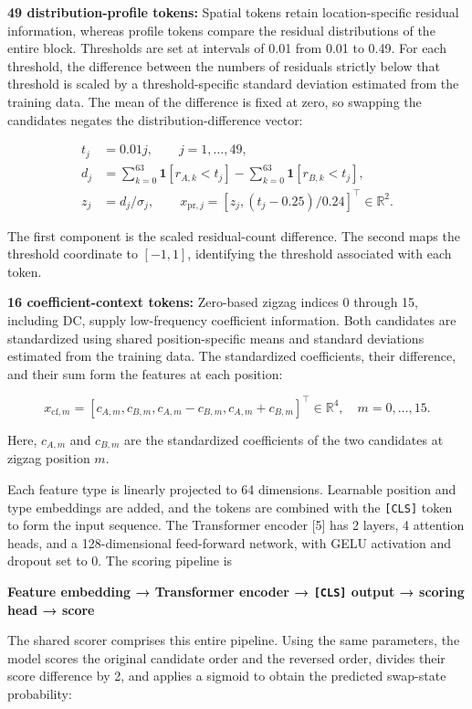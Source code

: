 \documentclass[
  11pt,
  a4paper,
]{article}
\begin{document}
\textbf{49 distribution-profile tokens:} Spatial tokens retain
location-specific residual information, whereas profile tokens compare
the residual distributions of the entire block. Thresholds are set at
intervals of 0.01 from 0.01 to 0.49. For each threshold, the difference
between the numbers of residuals strictly below that threshold is scaled
by a threshold-specific standard deviation estimated from the training
data. The mean of the difference is fixed at zero, so swapping the
candidates negates the distribution-difference vector:

\[
\begin{aligned}
t_j &= 0.01j,\qquad j=1,\dots,49,\\
d_j &= \sum_{k=0}^{63} \mathbf{1}[r_{A,k} < t_j] - \sum_{k=0}^{63} \mathbf{1}[r_{B,k} < t_j], \\
z_j &= d_j / \sigma_j, \qquad x_{\mathrm{pr},j} = [z_j, (t_j-0.25)/0.24]^\top \in \mathbb{R}^2.
\end{aligned} \tag{7}
\]

The first component is the scaled residual-count difference. The second
maps the threshold coordinate to \([-1,1]\), identifying the threshold
associated with each token.

\textbf{16 coefficient-context tokens:} Zero-based zigzag indices 0
through 15, including DC, supply low-frequency coefficient information.
Both candidates are standardized using shared position-specific means
and standard deviations estimated from the training data. The
standardized coefficients, their difference, and their sum form the
features at each position:

\[
x_{\mathrm{cf},m} = [c_{A,m}, c_{B,m}, c_{A,m}-c_{B,m}, c_{A,m}+c_{B,m}]^\top \in \mathbb{R}^4,
\quad m=0,\dots,15. \tag{8}
\]

Here, \(c_{A,m}\) and \(c_{B,m}\) are the standardized coefficients of
the two candidates at zigzag position \(m\).

Each feature type is linearly projected to 64 dimensions. Learnable
position and type embeddings are added, and the tokens are combined with
the \texttt{{[}CLS{]}} token to form the input sequence. The Transformer
encoder {[}5{]} has 2 layers, 4 attention heads, and a 128-dimensional
feed-forward network, with GELU activation and dropout set to 0. The
scoring pipeline is

\textbf{Feature embedding → Transformer encoder → \texttt{{[}CLS{]}}
output → scoring head → score}

The shared scorer comprises this entire pipeline. Using the same
parameters, the model scores the original candidate order and the
reversed order, divides their score difference by 2, and applies a
sigmoid to obtain the predicted swap-state probability:
\end{document}
